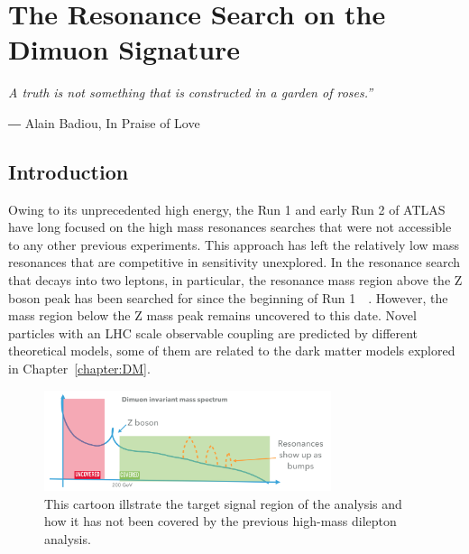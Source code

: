 \chapter{The Resonance Search on the Dimuon Signature}
\label{chapter:dimuon}

\epigraph{\textit{A truth is not something that is constructed in a garden of roses.” }}{― Alain Badiou, In Praise of Love}


\section{Introduction}

Owing to its unprecedented high energy, the Run 1 and early Run 2 of ATLAS have long focused on the high mass resonances searches that were not accessible to any other previous experiments. This approach has left the relatively low mass resonances that are competitive in sensitivity unexplored. In the resonance search that decays into two leptons, in particular, the resonance mass region above the Z boson peak has been searched for since the beginning of Run
1~\cite{Aaboud:2273892}~\cite{Dilepton2019}. However, the mass region below the Z mass peak remains uncovered to this date. Novel particles with an LHC scale observable coupling are predicted by different theoretical models, some of them are related to the dark matter models explored in Chapter~\ref{chapter:DM}.

\begin{figure}[!htb]
    \begin{center}
        \includegraphics[width=0.75\textwidth]{figures/chapter_dimuon/dimuonStudies}        
        \caption{
        This cartoon illstrate the target signal region of the analysis and how it has not been covered by the previous high-mass dilepton analysis. }
            \label{fig:dimuonstudies}
    \end{center}
\end{figure}
\FloatBarrier
   
